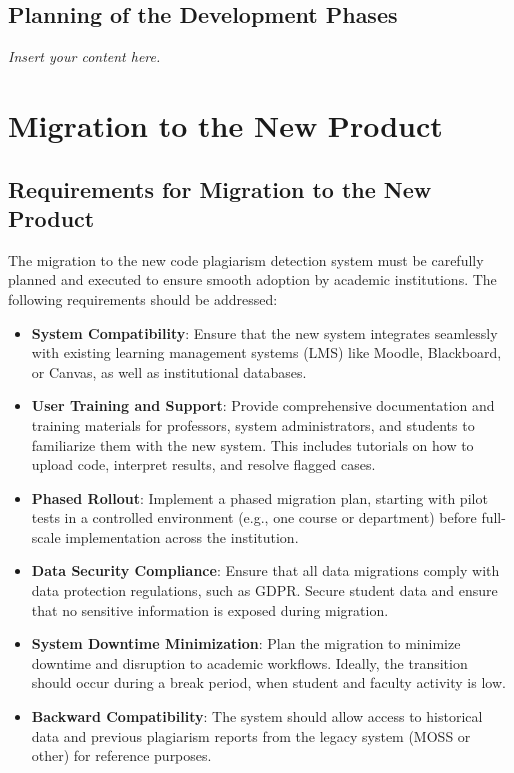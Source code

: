 \documentclass[12pt]{article}
\newcommand{\lips}{\textit{Insert your content here.}}
\begin{document}
\subsection{Planning of the Development Phases}
\lips

\section{Migration to the New Product}
\subsection{Requirements for Migration to the New Product}
The migration to the new code plagiarism detection system must be carefully planned and executed to ensure smooth adoption by academic institutions. The following requirements should be addressed:
\begin{itemize}
    \item \textbf{System Compatibility}: Ensure that the new system integrates seamlessly with existing learning management systems (LMS) like Moodle, Blackboard, or Canvas, as well as institutional databases.
    \item \textbf{User Training and Support}: Provide comprehensive documentation and training materials for professors, system administrators, and students to familiarize them with the new system. This includes tutorials on how to upload code, interpret results, and resolve flagged cases.
    \item \textbf{Phased Rollout}: Implement a phased migration plan, starting with pilot tests in a controlled environment (e.g., one course or department) before full-scale implementation across the institution.
    \item \textbf{Data Security Compliance}: Ensure that all data migrations comply with data protection regulations, such as GDPR. Secure student data and ensure that no sensitive information is exposed during migration.
    \item \textbf{System Downtime Minimization}: Plan the migration to minimize downtime and disruption to academic workflows. Ideally, the transition should occur during a break period, when student and faculty activity is low.
    \item \textbf{Backward Compatibility}: The system should allow access to historical data and previous plagiarism reports from the legacy system (MOSS or other) for reference purposes.
\end{itemize}
\end{document}
